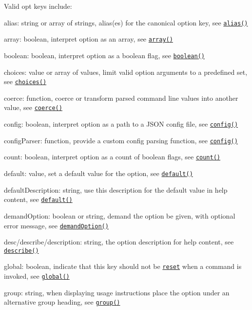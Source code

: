 Valid {\ttfamily opt} keys include\+:


\begin{DoxyItemize}
\item {\ttfamily alias}\+: string or array of strings, alias(es) for the canonical option key, see \href{#alias}{\tt {\ttfamily alias()}}
\item {\ttfamily array}\+: boolean, interpret option as an array, see \href{#array}{\tt {\ttfamily array()}}
\item {\ttfamily boolean}\+: boolean, interpret option as a boolean flag, see \href{#boolean}{\tt {\ttfamily boolean()}}
\item {\ttfamily choices}\+: value or array of values, limit valid option arguments to a predefined set, see \href{#choices}{\tt {\ttfamily choices()}}
\item {\ttfamily coerce}\+: function, coerce or transform parsed command line values into another value, see \href{#coerce}{\tt {\ttfamily coerce()}}
\item {\ttfamily config}\+: boolean, interpret option as a path to a J\+S\+ON config file, see \href{#config}{\tt {\ttfamily config()}}
\item {\ttfamily config\+Parser}\+: function, provide a custom config parsing function, see \href{#config}{\tt {\ttfamily config()}}
\item {\ttfamily count}\+: boolean, interpret option as a count of boolean flags, see \href{#count}{\tt {\ttfamily count()}}
\item {\ttfamily default}\+: value, set a default value for the option, see \href{#default}{\tt {\ttfamily default()}}
\item {\ttfamily default\+Description}\+: string, use this description for the default value in help content, see \href{#default}{\tt {\ttfamily default()}}
\item {\ttfamily demand\+Option}\+: boolean or string, demand the option be given, with optional error message, see \href{#demandOption}{\tt {\ttfamily demand\+Option()}}
\item {\ttfamily desc}/{\ttfamily describe}/{\ttfamily description}\+: string, the option description for help content, see \href{#describe}{\tt {\ttfamily describe()}}
\item {\ttfamily global}\+: boolean, indicate that this key should not be \href{#reset}{\tt reset} when a command is invoked, see \href{#global}{\tt {\ttfamily global()}}
\item {\ttfamily group}\+: string, when displaying usage instructions place the option under an alternative group heading, see \href{#group}{\tt {\ttfamily group()}}

\end{DoxyItemize}
